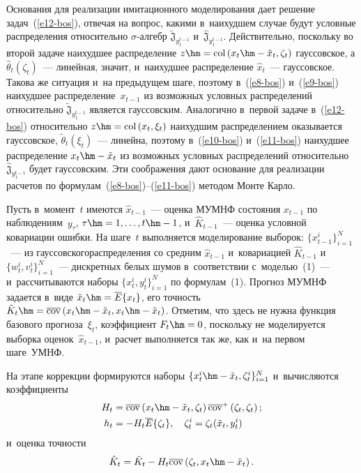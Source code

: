 \begin{multicols}{2}
    Основания для реализации имитационного моделирования дает решение 
задач~(\ref{e12-bos}), отвечая на вопрос, какими в~наихудшем случае будут 
условные распределения относительно $\sigma$-ал\-гебр 
$\tilde{\mathfrak{J}}_{y_1^{t-1}}$ и~$\hat{\mathfrak{J}}_{y_1^{t-1}}$. 
Действительно, поскольку во второй задаче наихудшее распределение $z\hm= 
\mathrm{col}\left (x_t\hm- \tilde{x}_t, \zeta_t\right)$ гауссовское, а $\hat{\theta}_t(\zeta_t)$~--- 
линейная, значит, и~наихудшее распределение $\hat{x}_t$~--- гауссовское. 
Такова же ситуация и~на предыдущем шаге, поэтому в~(\ref{e8-bos}) 
и~(\ref{e9-bos}) наихудшее распределение~$x_{t-1}$ из возможных условных 
распределений относительно $\tilde{\mathfrak{J}}_{y_1^{t-1}}$ является 
гауссовским. Аналогично в~первой задаче в~(\ref{e12-bos}) относительно 
$z\hm= \mathrm{col}\left (x_t, \xi_t\right)$ наихудшим распределением оказывается гауссовское, 
$\tilde{\theta}_t\left(\xi_t\right)$~--- линейна, поэтому в~(\ref{e10-bos}) и~(\ref{e11-bos}) 
наихудшее распределение $x_t\hm-\tilde{x}_t$ из возможных условных 
распределений относительно $\hat{\mathfrak{J}}_{y_1^{t-1}}$ будет 
гауссовским. Эти соображения дают основание для реализации расчетов по 
формулам~(\ref{e8-bos})--(\ref{e11-bos}) методом Мон\-те Карло.
    
    Пусть в~момент~$t$ имеются $\hat{x}_{t-1}$~--- оценка МУМНФ состояния 
$x_{t-1}$ по наблюдениям~$y_\tau$, $\tau\hm=1,\ldots , t\hm-1$,  
и~$\hat{K}_{t-1}$~--- оценка условной ковариации ошибки. На шаге~$t$ 
выполняется моделирование выборок: $\{x^i_{t-1}\}^N_{i=1}$~--- из 
гауссовского\linebreak распределения со средним $\hat{x}_{t-1}$ и~ковариацией 
$\hat{K}_{t-1}$ и~$\{ w^i_t, v_t^i\}^N_{i=1}$~--- дискретных белых шумов 
в~соответствии с~моделью~(1)~--- и~рассчитываются наборы $\{x_t^i, 
y_t^i\}^N_{i=1}$ по формулам~(1). Прогноз МУМНФ задается в~виде 
$\tilde{x}_t\hm=\overline{E}\{x_t\}$, его точность $\tilde{K}_t\hm= 
\overline{\mathrm{cov}}\left(x_t\hm- \tilde{x}_t, x_t\hm- \tilde{x}_t\right)$. Отметим, что здесь не 
нужна функция базового прогноза~$\xi_t$, коэффициент $F_t\hm=0$, 
поскольку не моделируется выборка оценок~$\hat{x}_{t-1}$, и~расчет 
выполняется так же, как и~на первом шаге~УМНФ.
{ %

}
    
    На этапе коррекции формируются наборы $\{ x_t^i \hm- \tilde{x}_t, 
\zeta_t^i\}^N_{i=1}$ и~вычисляются коэффициенты 
    \begin{align*}
    H_t&= \overline{\mathrm{cov}} \left(x_t\hm- \tilde{x}_t, \zeta_t\right)
    \overline{\mathrm{cov}}^+  \left(\zeta_t, \zeta_t\right);\\ 
    h_t&= -H_t \overline{E}\{\zeta_t\},\quad 
    \zeta_t^i=  \zeta_t(\tilde{x}_t, y_t^i)
   \end{align*}
    и~оценка точ\-ности 
    $$
    \hat{K}_t= \tilde{K}_t- H_t 
\overline{\mathrm{cov}} \left(\zeta_t, x_t\hm- \tilde{x}_t\right).
$$


\end{multicols}
